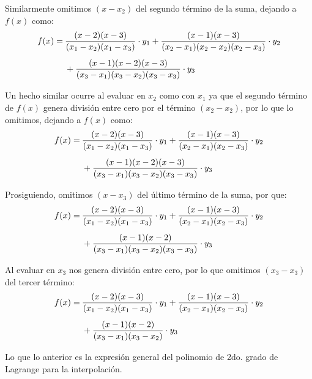 \documentclass[letterpaper, 12pt]{article}
\begin{document}
\justify
Similarmente omitimos \(\left(x-x_2\right)\) del segundo término de la suma, dejando a \(f(x)\) como:
{\large\begin{equation*}
    \begin{aligned}
        f(x)=\:&{(x-2)(x-3)\over(x_1-x_2)(x_1-x_3)}\cdot y_1+
{(x-1)(x-3)\over(x_2-x_1)(x_2-x_2)(x_2-x_3)}\cdot y_2\\[5pt]
&+{(x-1)(x-2)(x-3)\over(x_3-x_1)(x_3-x_2)(x_3-x_3)}\cdot y_3\\[5pt]
    \end{aligned}
\end{equation*}}
\justify
Un hecho similar ocurre al evaluar en \(x_2\) como con \(x_1\) ya que el segundo término de \(f(x)\) genera división entre cero por
el término \(\left(x_2-x_2\right)\), por lo que lo omitimos, dejando a \(f(x)\) como:
{\large\begin{equation*}
    \begin{aligned}
        f(x)=\:&{(x-2)(x-3)\over(x_1-x_2)(x_1-x_3)}\cdot y_1+
{(x-1)(x-3)\over(x_2-x_1)(x_2-x_3)}\cdot y_2\\[5pt]
&+{(x-1)(x-2)(x-3)\over(x_3-x_1)(x_3-x_2)(x_3-x_3)}\cdot y_3\\[5pt]
    \end{aligned}
\end{equation*}}
\justify
Prosiguiendo, omitimos \(\left(x-x_3\right)\) del último término de la suma, por que:
{\large\begin{equation*}
    \begin{aligned}
        f(x)=\:&{(x-2)(x-3)\over(x_1-x_2)(x_1-x_3)}\cdot y_1+
{(x-1)(x-3)\over(x_2-x_1)(x_2-x_3)}\cdot y_2\\[5pt]
&+{(x-1)(x-2)\over(x_3-x_1)(x_3-x_2)(x_3-x_3)}\cdot y_3\\[5pt]
    \end{aligned}
\end{equation*}}
\justify
Al evaluar en \(x_3\) nos genera división entre cero, por lo que omitimos \(\left(x_3-x_3\right)\) del tercer término:
{\large\begin{equation*}
    \begin{aligned}
        f(x)=\:&{(x-2)(x-3)\over(x_1-x_2)(x_1-x_3)}\cdot y_1+
{(x-1)(x-3)\over(x_2-x_1)(x_2-x_3)}\cdot y_2\\[5pt]
&+{(x-1)(x-2)\over(x_3-x_1)(x_3-x_2)}\cdot y_3\\[5pt]
    \end{aligned}
\end{equation*}}
\justify
Lo que lo anterior es la expresión general del polinomio de 2do. grado de Lagrange para la interpolación.
\end{document}
